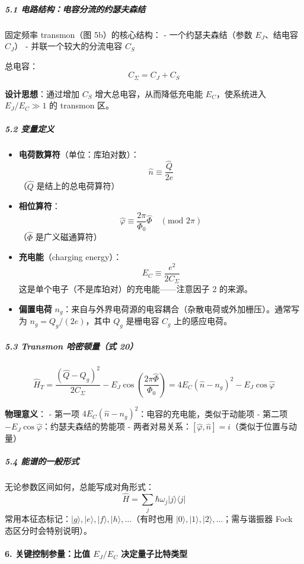 \documentclass[12pt,a4paper,oneside]{ctexbook}
\let\oldparagraph\paragraph
\renewcommand{\paragraph}[1]{\oldparagraph{#1}\mbox{}}
\let\oldsubparagraph\subparagraph
\renewcommand{\subparagraph}[1]{\oldsubparagraph{#1}\mbox{}}
\begin{document}
\subparagraph{5.1
电路结构：电容分流的约瑟夫森结}\label{ux7535ux8defux7ed3ux6784ux7535ux5bb9ux5206ux6d41ux7684ux7ea6ux745fux592bux68eeux7ed3}

固定频率 transmon（图 5b）的核心结构： - 一个约瑟夫森结（参数
\(E_J\)、结电容 \(C_J\)） - 并联一个较大的分流电容 \(C_S\)

总电容： \[C_\Sigma = C_J + C_S\]

\textbf{设计思想}：通过增加 \(C_S\) 增大总电容，从而降低充电能
\(E_C\)，使系统进入 \(E_J/E_C \gg 1\) 的 transmon 区。

\subparagraph{5.2 变量定义}\label{ux53d8ux91cfux5b9aux4e49}

\begin{itemize}
\item
  \textbf{电荷数算符}（单位：库珀对数）：
  \[\hat n \equiv \frac{\hat Q}{2e}\] （\(\hat Q\) 是结上的总电荷算符）
\item
  \textbf{相位算符}：
  \[\hat\varphi \equiv \frac{2\pi}{\Phi_0}\hat\Phi \quad (\text{mod } 2\pi)\]
  （\(\hat\Phi\) 是广义磁通算符）
\item
  \textbf{充电能}（charging energy）：
  \[E_C \equiv \frac{e^2}{2C_\Sigma}\]
  这是单个电子（不是库珀对）的充电能------注意因子 2 的来源。
\item
  \textbf{偏置电荷}
  \(n_g\)：来自与外界电荷源的电容耦合（杂散电荷或外加栅压）。通常写为
  \(n_g = Q_g/(2e)\)，其中 \(Q_g\) 是栅电容 \(C_g\) 上的感应电荷。
\end{itemize}

\subparagraph{5.3 Transmon 哈密顿量（式
20）}\label{transmon-ux54c8ux5bc6ux987fux91cfux5f0f-20}

\[\hat H_T = \frac{(\hat Q - Q_g)^2}{2C_\Sigma} - E_J\cos\left(\frac{2\pi\hat\Phi}{\Phi_0}\right) = 4E_C(\hat n - n_g)^2 - E_J\cos\hat\varphi\]

\textbf{物理意义}： - 第一项
\(4E_C(\hat n - n_g)^2\)：电容的充电能，类似于动能项 - 第二项
\(-E_J\cos\hat\varphi\)：约瑟夫森结的势能项 -
两者对易关系：\([\hat\varphi, \hat n] = i\)（类似于位置与动量）

\subparagraph{5.4
能谱的一般形式}\label{ux80fdux8c31ux7684ux4e00ux822cux5f62ux5f0f}

无论参数区间如何，总能写成对角形式：
\[\hat H = \sum_j \hbar\omega_j |j\rangle\langle j|\]
常用本征态标记：\(|g\rangle,|e\rangle,|f\rangle,|h\rangle,\dots\)（有时也用
\(|0\rangle,|1\rangle,|2\rangle,\dots\)；需与谐振器 Fock
态区分时会特别说明）。


\paragraph{\texorpdfstring{6. 关键控制参量：比值 \(E_J/E_C\)
决定量子比特类型}{6. 关键控制参量：比值 E\_J/E\_C 决定量子比特类型}}\label{ux5173ux952eux63a7ux5236ux53c2ux91cfux6bd4ux503c-e_je_c-ux51b3ux5b9aux91cfux5b50ux6bd4ux7279ux7c7bux578b}
\end{document}
